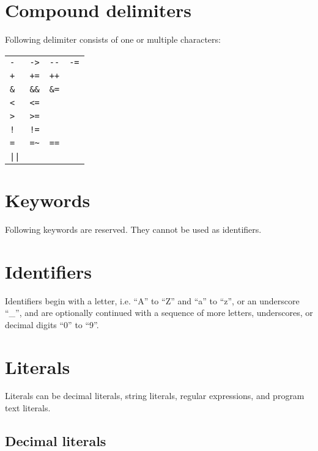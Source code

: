 \section{Compound delimiters}

Following delimiter consists of one or multiple characters:

\bigskip
\noindent
\begin{tabular}{l l l l}
   \lstinline!-! & \lstinline!->! & \lstinline!--! & \lstinline!-=! \\
   \lstinline!+! & \lstinline!+=! & \lstinline!++! \\
   \lstinline!&! & \lstinline!&&! & \lstinline!&=! \\
   \lstinline!<! & \lstinline!<=! \\
   \lstinline!>! & \lstinline!>=! \\
   \lstinline/!/ & \lstinline/!=/ \\
   \lstinline!=! & \lstinline!=~! & \lstinline!==! \\
   \lstinline!||! \\
\end{tabular}

\section{Keywords}

Following keywords are reserved. They cannot be used as identifiers.

\bigskip
\noindent


\section{Identifiers}

Identifiers begin with a letter, i.e. ``A'' to ``Z'' and ``a'' to ``z'',
or an underscore ``\_'', and are optionally continued with a sequence
of more letters, underscores, or decimal digits ``0'' to ``9''.

\section{Literals}

Literals can be decimal literals, string literals, regular expressions,
and program text literals.

\subsection{Decimal literals}

